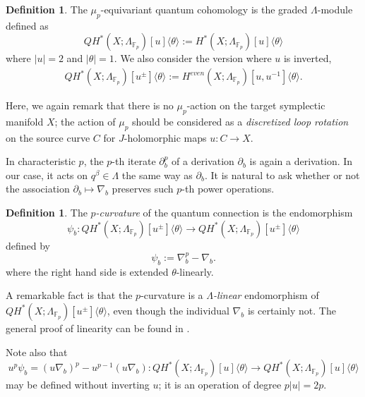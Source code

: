 \documentclass[reqno]{amsart}
\numberwithin{equation}{section}
\numberwithin{equation}{section}
\numberwithin{equation}{section}
\theoremstyle{definition}
\newtheorem{defn}[thm]{Definition}
\theoremstyle{remark}
\theoremstyle{remark}
\begin{document}
\begin{defn}
    The $\mu_p$-equivariant quantum cohomology is the graded $\Lambda$-module defined as
    \begin{equation}
        QH^*(X;\Lambda_{\mathbb{F}_p})[u]\langle \theta \rangle  := H^*(X;\Lambda_{\mathbb{F}_p})[u]\langle \theta \rangle
    \end{equation}
    where $|u| = 2$ and $|\theta|=1$. We also consider the version where $u$ is inverted, \begin{align} 
QH^*(X;\Lambda_{\mathbb{F}_p})[u^\pm]\langle \theta \rangle:=H^{even}(X; \Lambda_{\mathbb{F}_p})[u,u^{-1}]\langle \theta \rangle . 
\end{align}
\end{defn}
Here, we again remark that there is no $\mu_p$-action on the target symplectic manifold $X$; the action of $\mu_p$ should be considered as a \emph{discretized loop rotation} on the source curve $C$ for $J$-holomorphic maps $u: C \to X$.



In characteristic $p$, the $p$-th iterate $\partial_b^p$ of a derivation $\partial_b$ is again a derivation. In our case, it acts on $q^\beta \in \Lambda$ the same way as $\partial_b$. It is natural to ask whether or not the association $\partial_b \mapsto \nabla_b$ preserves such $p$-th power operations.

\begin{defn}
    The \emph{$p$-curvature} of the quantum connection is the endomorphism 
    $$\psi_b: QH^*(X;\Lambda_{\mathbb{F}_p})[u^\pm ]\langle \theta \rangle \to  QH^*(X;\Lambda_{\mathbb{F}_p})[u^\pm ] \langle \theta \rangle$$ defined by
    \begin{equation}
        \psi_b := \nabla_b^p - \nabla_b.
    \end{equation}
    where the right hand side is extended $\theta$-linearly.
\end{defn}
A remarkable fact is that the $p$-curvature is a \emph{$\Lambda$-linear} endomorphism of $QH^*(X;\Lambda_{\mathbb{F}_p})[u^\pm ]\langle \theta \rangle$, even though the individual $\nabla_b$ is certainly not. The general proof of linearity can be found in \cite[Section 5]{Kat70}. 

Note also that
\begin{equation}
    u^p \psi_b  = (u \nabla_b)^p - u^{p-1} (u\nabla_b) : QH^*(X;\Lambda_{\mathbb{F}_p})[u ]\langle \theta \rangle \to QH^*(X;\Lambda_{\mathbb{F}_p})[u ]\langle \theta \rangle
\end{equation}
may be defined without inverting $u$; it is an operation of degree $p|u| = 2p$.
\end{document}
